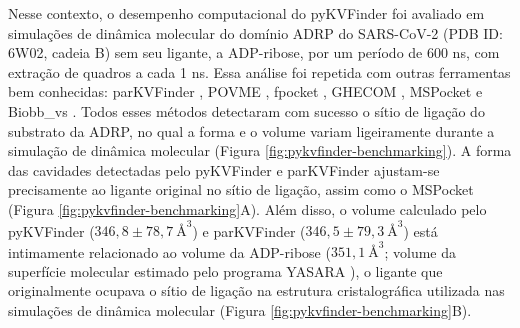\documentclass[Portugues]{phdquali}
\newcommand{\mAA}{~\text{\AA}}
\begin{document}
Nesse contexto, o desempenho computacional do pyKVFinder foi avaliado em simulações de dinâmica molecular do domínio ADRP do SARS-CoV-2 (PDB ID: 6W02, cadeia B) sem seu ligante, a ADP-ribose, por um período de 600 ns, com extração de quadros a cada 1 ns. Essa análise foi repetida com outras ferramentas bem conhecidas: parKVFinder \cite{guerra2020}, POVME \cite{povme}, fpocket \cite{fpocket}, GHECOM \cite{ghecom}, MSPocket \cite{mspocket} e Biobb\_vs \cite{biobbvs}. Todos esses métodos detectaram com sucesso o sítio de ligação do substrato da ADRP, no qual a forma e o volume variam ligeiramente durante a simulação de dinâmica molecular (Figura \ref{fig:pykvfinder-benchmarking}). A forma das cavidades detectadas pelo pyKVFinder e parKVFinder ajustam-se precisamente ao ligante original no sítio de ligação, assim como o MSPocket (Figura \ref{fig:pykvfinder-benchmarking}A). Além disso, o volume calculado pelo pyKVFinder ($346,8 \pm 78,7 \mAA^3$) e parKVFinder ($346,5 \pm 79,3 \mAA^3$) está intimamente relacionado ao volume da ADP-ribose ($351,1 \mAA^3$; volume da superfície molecular estimado pelo programa YASARA \cite{yasara}), o ligante que originalmente ocupava o sítio de ligação na estrutura cristalográfica utilizada nas simulações de dinâmica molecular (Figura \ref{fig:pykvfinder-benchmarking}B).
\end{document}

